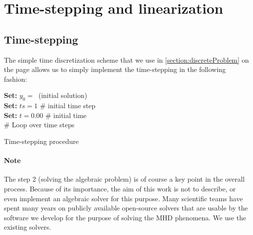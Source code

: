 \section{Time-stepping and linearization}

\subsection{Time-stepping}
The simple time discretization scheme that we use in \ref{section:discreteProblem} on the page \pageref{section:discreteProblem} allows us to simply implement the time-stepping in the following fashion:\\
\begin{algorithm}[H]
\textbf{    Set: }$y_0 =\ $ (initial solution)\\
\textbf{    Set: }$ts = 1 $ \# initial time step\\
\textbf{    Set: }$t = 0.00 $ \# initial time\\
    \# Loop over time steps\\
    \caption{Time-stepping procedure}
\label{algorithm:timeStepping}
\end{algorithm}
\paragraph{Note}
\label{note:solvers}
The step 2 (solving the algebraic problem) is of course a key point in the overall process. Because of its importance, the aim of this work is not to describe, or even implement an algebraic solver for this purpose. Many scientific teams have spent many years on publicly available open-source solvers that are usable by the software we develop for the purpose of solving the MHD phenomena. We use the existing solvers.